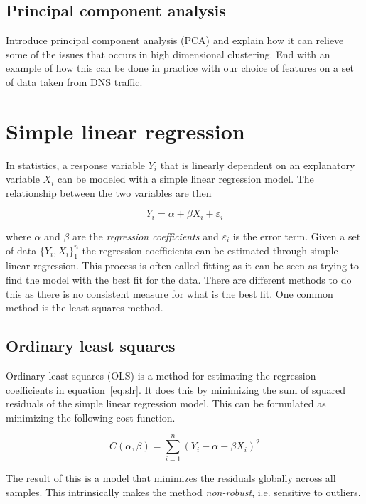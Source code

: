 \documentclass[a4paper]{report}
\begin{document}
\subsection{Principal component analysis}
Introduce principal component analysis (PCA) and explain how it can relieve
some of the issues that occurs in high dimensional clustering. End with an
example of how this can be done in practice with our choice of features on a
set of data taken from DNS traffic.

\section{Simple linear regression}
In statistics, a response variable $Y_i$ that is linearly dependent on an
explanatory variable $X_i$ can be modeled with a simple linear regression
model. The relationship between the two variables are then

\begin{equation}
    Y_i = \alpha + \beta X_i + \varepsilon_i
    \label{eq:slr}
\end{equation}

where $\alpha$ and $\beta$ are the \emph{regression coefficients} and
$\varepsilon_i$ is the error term. Given a set of data $\{Y_i, X_i\}_1^n$ the
regression coefficients can be estimated through simple linear regression. This
process is often called fitting as it can be seen as trying to find the model
with the best fit for the data. There are different methods to do this as there
is no consistent measure for what is the best fit. One common method is the
least squares method.

\subsection{Ordinary least squares}
Ordinary least squares (OLS) is a method for estimating the regression
coefficients in equation~\ref{eq:slr}. It does this by minimizing the sum of
squared residuals of the simple linear regression model. This can be formulated
as minimizing the following cost function.

\begin{equation}
    C(\alpha, \beta) = \sum_{i=1}^n(Y_i - \alpha - \beta X_i)^2
\end{equation}

The result of this is a model that minimizes the residuals globally across all
samples. This intrinsically makes the method \emph{non-robust}, i.e. sensitive
to outliers.
\end{document}
